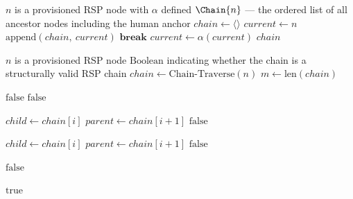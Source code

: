 \begin{algorithm}
\caption{Chain-Traverse($n$) — Build the delegation chain from node $n$ to the human anchor}
\label{alg:chain-traverse}
\begin{algorithmic}[1]
\REQUIRE $n$ is a provisioned RSP node with $\alpha$ defined
\ENSURE $\Chain{n}$ — the ordered list of all ancestor nodes including the human anchor
\STATE $chain \leftarrow \langle \rangle$ 
\STATE $current \leftarrow n$ 
    \STATE $\mathrm{append}(chain,\ current)$ 
        \STATE $\textbf{break}$ 
    \ENDIF
    \STATE $current \leftarrow \alpha(current)$ 
\ENDWHILE
\RETURN $chain$
\end{algorithmic}
\end{algorithm}

\begin{algorithm}
\caption{Chain-Verify($n$) — Verify the authorization chain from node $n$ to human anchor}
\label{alg:chain-verify}
\begin{algorithmic}[1]
\REQUIRE $n$ is a provisioned RSP node
\ENSURE $\mathrm{Boolean}$ indicating whether the chain is a structurally valid RSP chain
\STATE $chain \leftarrow \mathrm{Chain\text{-}Traverse}(n)$
\STATE $m \leftarrow \mathrm{len}(chain)$

\STATE {}
    \STATE \RETURN $\text{false}$ 
\ENDIF
{}
    \STATE \RETURN $\text{false}$ 
\ENDIF

\STATE {}
    \STATE $child \leftarrow chain[i]$
    \STATE $parent \leftarrow chain[i+1]$
        \STATE \RETURN $\text{false}$ 
    \ENDIF
\ENDFOR

\STATE {}
    \STATE $child \leftarrow chain[i]$
    \STATE $parent \leftarrow chain[i+1]$
        \STATE \RETURN $\text{false}$ 
    \ENDIF
\ENDFOR

\STATE {}
        \STATE \RETURN $\text{false}$ 
    \ENDIF
\ENDFOR

\RETURN $\text{true}$
\end{algorithmic}
\end{algorithm}

